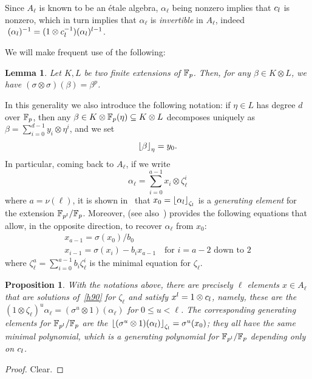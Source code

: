 \documentclass{sig-alternate}
\newtheorem{proposition}[theorem]{Proposition}
\newtheorem{lemma}[theorem]{Lemma}
\begin{document}
Since $A_\ell$ is known to be an \'etale algebra, 
$\alpha_\ell$ being nonzero implies that $c_l$ is nonzero, which in turn implies
that $\alpha_\ell$ is \emph{invertible} in $A_\ell$, indeed $\;(\alpha_l)^{-1} = (1\otimes c_l^{-1})(\alpha_l)^{l-1}$.


We will make frequent use of the following:
\begin{lemma}
\label{FrobFrob}
Let $K,L$ be two finite extensions of $\mathbb{F}_{p}$.
Then, for any $\beta\in K\otimes L$,
we have $(\sigma\otimes\sigma)(\beta)=\beta^p$.
\end{lemma}
In this generality we also introduce the following notation: if $\eta\in L$ has degree $d$ over $\mathbb{F}_{p}$,
then any $\beta\in K\otimes\mathbb{F}_{p}(\eta)\subseteq K\otimes L$ decomposes uniquely as $\beta = \sum_{i =  0}^{d-1}y_i\otimes\eta^i$,
and we set  \[ \left\lfloor \beta \right\rfloor_{\eta}=y_0. \]
In particular, coming back to $A_\ell$, if we write
\[ \alpha_\ell = \sum_{i=0}^{a-1}x_i\otimes\zeta_{\ell}^i \] where $a=\nu(\ell)$,
it is shown in~\cite{Allombert02} that $x_0=\left\lfloor \alpha_l \right\rfloor_{\zeta_l}$ is a \emph{generating element} for the extension
$\mathbb{F}_{p^l}/\mathbb{F}_{p}$.
Moreover, \cite{Allombert02} (see also~\cite{brieulle2018computing}) provides the following equations
that allow, in the opposite direction, to recover $\alpha_\ell$ from $x_0$:
\begin{equation}
\label{recoveralpha}
\begin{array}{l}
x_{a-1}=\sigma(x_0)/b_0\\
x_{i-1}=\sigma(x_i)-b_ix_{a-1}\quad\text{for $i=a-2$ down to $2$}
\end{array}
\end{equation}
where $\zeta_\ell^a=\sum_{i=0}^{a-1}b_i\zeta_\ell^i$ is the minimal equation for $\zeta_\ell$.

\begin{proposition}
\label{depend}
With the notations above, there are precisely $\ell$ elements $x\in A_\ell$ that are solutions of~\eqref{h90} for $\zeta_\ell$
and satisfy $x^l=1\otimes c_l$, namely, these are the $(1\otimes\zeta_\ell)^u\alpha_\ell=(\sigma^u\otimes 1)(\alpha_\ell)$
for $0\leq u<\ell$.
The corresponding generating elements for $\mathbb{F}_{p^l}/\mathbb{F}_{p}$ are the $\left\lfloor (\sigma^u\otimes 1)(\alpha_l) \right\rfloor_{\zeta_l}=\sigma^u(x_0)$;
they all have the same minimal polynomial, which is a generating polynomial for $\mathbb{F}_{p^l}/\mathbb{F}_{p}$ depending only on $c_l$.
\end{proposition}
\begin{proof}
Clear.
\end{proof}
\end{document}
